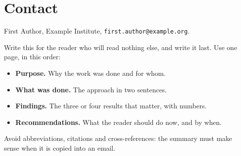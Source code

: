 \documentclass[11pt,a4paper,oneside,openany,titlepage,
               headings=small,bibliography=totoc,numbers=noenddot]{scrreprt}
\newcommand{\reportorg}{Example Institute}
\begin{document}
\section*{Contact}
First Author, \reportorg, \texttt{first.author@example.org}.

Write this for the reader who will read nothing else, and write it last. Use one page,
in this order:
\begin{itemize}
  \item \textbf{Purpose.} Why the work was done and for whom.
  \item \textbf{What was done.} The approach in two sentences.
  \item \textbf{Findings.} The three or four results that matter, with numbers.
  \item \textbf{Recommendations.} What the reader should do now, and by when.
\end{itemize}
Avoid abbreviations, citations and cross-references: the summary must make sense when it is
copied into an email.

\tableofcontents
\listoffigures
\listoftables

\clearpage
{}






\appendix




\end{document}
